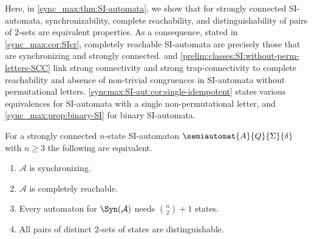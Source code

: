 
Here, in \cref{sync_max:thm:SI-automata},
we show that for strongly connected SI-automata,
synchronizability, complete reachability,
and distinguishability of pairs of $2$-sets
are equivalent properties. As a consequence, stated in \cref{sync_max:cor:SIcr},
completely reachable SI-automata are precisely those that
are synchronizing and strongly connected.
 and \cref{prelim:classes:SI:without-perm-letters-SCC} 
link strong connectivity and strong trap-connectivity
to complete reachability and absence of non-trivial congruences
in SI-automata without permutational letters.
\cref{syncmax:SI-aut:cor:single-idempotent} states various equivalences for SI-automata with a single non-permutational letter,
and \cref{sync_max:prop:binary-SI} for binary SI-automata.

\begin{theorem}
	\label{sync_max:thm:SI-automata}
	For a strongly connected $n$-state SI-automaton $\semiautomat{A}{Q}{\Sigma}{\delta}$ with $n \ge 3$ the following are equivalent.
	\begin{enumerate}
		\item \label{sync_max:thm:SI-automata:1} $\mathcal A$ is synchronizing.
		
		\item \label{sync_max:thm:SI-automata:2} $\mathcal A$ is completely reachable. 
		
		\item \label{sync_max:thm:SI-automata:4} Every automaton for $\Syn(\mathcal A)$ needs $\binom{n}{2} + 1$ states.
		
		\item \label{sync_max:thm:pairs-2-sets} All pairs of distinct $2$-sets of states are distinguishable.
	\end{enumerate}
\end{theorem}
